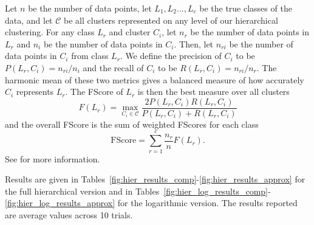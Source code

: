 \documentclass[conference, 10pt, final]{IEEEtran}
\begin{document}
Let $n$ be the number of data points, let $L_1, L_2 \ldots, L_c$ be the true classes of the data, and let $\mathcal{C}$ be all clusters represented on any level of our hierarchical clustering. For any class $L_r$ and cluster $C_i$, let $n_r$ be the number of data points in $L_r$ and $n_i$ be the number of data points in $C_i$. Then, let $n_{ri}$ be the number of data points in $C_i$ from class $L_r$. We define the precision of $C_i$ to be $P(L_r, C_i) = n_{ri}/n_i$ and the recall of $C_i$ to be $R(L_r, C_i) = n_{ri}/n_r$. The harmonic mean of these two metrics gives a balanced measure of how accurately $C_i$ represents $L_r$. The FScore of $L_r$ is then the best measure over all clusters
\begin{equation}
 F(L_r) = \max_{C_i \in \mathcal{C}}  \frac{ 2 P(L_r, C_i)  R(L_r, C_i)}{ P(L_r, C_i) + R(L_r, C_i)} 
\end{equation}
and the overall FScore is the sum of weighted FScores for each class
\begin{equation}
\mathrm{FScore} = \sum_{r=1}^c \frac{n_r}{n} F(L_r).
\end{equation}
See \cite{Larsen} for more information. 

Results are given in Tables~\ref{fig:hier_results_comp}-\ref{fig:hier_results_approx} for the full hierarchical version and in Tables~\ref{fig:hier_log_results_comp}-\ref{fig:hier_log_results_approx} for the logarithmic version. The results reported are average values across 10 trials.
\end{document}
